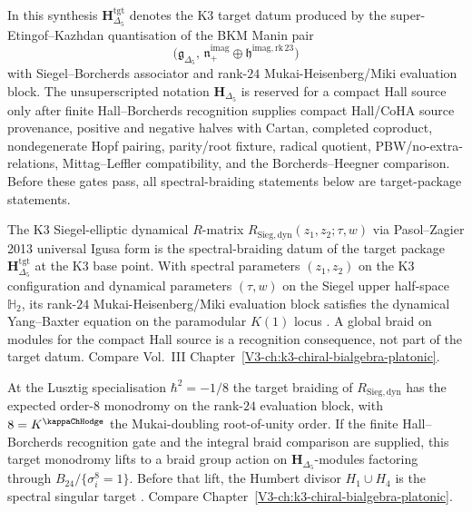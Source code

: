 \begin{remark}
In this synthesis $\mathbf H_{\Delta_5}^{\mathrm{tgt}}$ denotes the
K3 target datum produced by the super-Etingof--Kazhdan quantisation
of the BKM Manin pair
\[
\bigl(\mathfrak g_{\Delta_5},\,
\mathfrak n_+^{\mathrm{imag}}\oplus
\mathfrak h^{\mathrm{imag,rk\,23}}\bigr)
\]
with Siegel--Borcherds associator and rank-$24$
Mukai-Heisenberg/Miki evaluation block. The unsuperscripted notation
$\mathbf H_{\Delta_5}$ is reserved for a compact Hall source only after
finite Hall--Borcherds recognition supplies compact Hall/CoHA source
provenance, positive and negative halves with Cartan, completed
coproduct, nondegenerate Hopf pairing, parity/root fixture, radical
quotient, PBW/no-extra-relations, Mittag--Leffler compatibility, and
the Borcherds--Heegner comparison. Before these gates pass, all
spectral-braiding statements below are target-package statements.
\end{remark}

\begin{remark}
\label{rem:specbraid-1}
The K3 Siegel-elliptic dynamical $R$-matrix
$R_{\mathrm{Sieg,dyn}}(z_1, z_2;\tau, w)$ via Pasol--Zagier 2013
universal Igusa form is the spectral-braiding datum of the target
package $\mathbf H_{\Delta_5}^{\mathrm{tgt}}$ at the K3 base point.
With spectral parameters $(z_1, z_2)$ on the K3 configuration and
dynamical parameters $(\tau, w)$ on the Siegel upper half-space
$\mathbb H_2$, its rank-$24$ Mukai-Heisenberg/Miki evaluation block
satisfies the dynamical Yang--Baxter equation on the paramodular
$K(1)$ locus \cite{PasolZagier2013,Felder1995}. A global braid on
modules for the compact Hall source is a recognition consequence, not
part of the target datum. Compare Vol.~III
Chapter~\ref{V3-ch:k3-chiral-bialgebra-platonic}.
\end{remark}

\begin{remark}
\label{rem:specbraid-2}
At the Lusztig specialisation $\hbar^2 = -1/8$ the target braiding of
$R_{\mathrm{Sieg,dyn}}$ has the expected order-$8$ monodromy on the
rank-$24$ evaluation block, with $8 = K^{\kappaChHodge}$ the
Mukai-doubling root-of-unity order. If the finite Hall--Borcherds
recognition gate and the integral braid comparison are supplied, this
target monodromy lifts to a braid group action on
$\mathbf H_{\Delta_5}$-modules factoring through
$B_{24}/\{\sigma_i^8 = 1\}$. Before that lift, the Humbert divisor
$H_1\cup H_4$ is the spectral singular target
\cite{Lusztig1990,Bruinier2002}. Compare
Chapter~\ref{V3-ch:k3-chiral-bialgebra-platonic}.
\end{remark}

